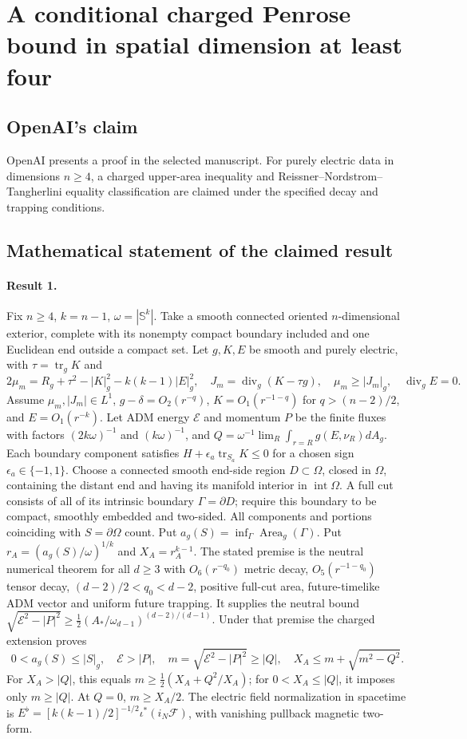 \documentclass[11pt]{article}
\begin{document}
\section*{A conditional charged Penrose bound in spatial dimension at least four}

\subsection{OpenAI's claim}
OpenAI presents a proof in the selected manuscript. For purely electric data in dimensions $n\geq4$, a charged upper-area inequality and Reissner--Nordstrom--Tangherlini equality classification are claimed under the specified decay and trapping conditions.

\subsection{Mathematical statement of the claimed result}
\paragraph{Result 1.} Fix $n\ge4$, $k=n-1$, $\omega=|\mathbb S^k|$. Take a smooth connected oriented $n$-dimensional exterior, complete with its nonempty compact boundary included and one Euclidean end outside a compact set. Let $g,K,E$ be smooth and purely electric, with $\tau=\operatorname{tr}_gK$ and
\[
 2\mu_m=R_g+\tau^2-|K|_g^2-k(k-1)|E|_g^2,\quad
 J_m=\operatorname{div}_g(K-\tau g),\quad
 \mu_m\ge|J_m|_g,\quad\operatorname{div}_gE=0.
\]
Assume $\mu_m,|J_m|\in L^1$, $g-\delta=O_2(r^{-q})$, $K=O_1(r^{-1-q})$ for $q>(n-2)/2$, and $E=O_1(r^{-k})$. Let ADM energy $\mathcal E$ and momentum $P$ be the finite fluxes with factors $(2k\omega)^{-1}$ and $(k\omega)^{-1}$, and $Q=\omega^{-1}\lim_R\int_{r=R}g(E,\nu_R)dA_g$. Each boundary component satisfies $H+\epsilon_a\operatorname{tr}_{S_a}K\le0$ for a chosen sign $\epsilon_a\in\{-1,1\}$. Choose a connected smooth end-side region $D\subset\Omega$, closed in $\Omega$, containing the distant end and having its manifold interior in $\operatorname{int}\Omega$. A full cut consists of all of its intrinsic boundary $\Gamma=\partial D$; require this boundary to be compact, smoothly embedded and two-sided. All components and portions coinciding with $S=\partial\Omega$ count. Put $a_g(S)=\inf_\Gamma\operatorname{Area}_g(\Gamma)$. Put $r_A=(a_g(S)/\omega)^{1/k}$ and $X_A=r_A^{k-1}$. The stated premise is the neutral numerical theorem for all $d\ge3$ with $O_6(r^{-q_0})$ metric decay, $O_5(r^{-1-q_0})$ tensor decay, $(d-2)/2<q_0<d-2$, positive full-cut area, future-timelike ADM vector and uniform future trapping. It supplies the neutral bound $\sqrt{\mathcal E^2-|P|^2}\ge\frac12(A_*/\omega_{d-1})^{(d-2)/(d-1)}$. Under that premise the charged extension proves
\[
 0<a_g(S)\le|S|_g,\quad\mathcal E>|P|,\quad m=\sqrt{\mathcal E^2-|P|^2}\ge|Q|,\quad
 X_A\le m+\sqrt{m^2-Q^2}.
\]
For $X_A>|Q|$, this equals $m\ge\frac12(X_A+Q^2/X_A)$; for $0<X_A\le|Q|$, it imposes only $m\ge|Q|$. At $Q=0$, $m\ge X_A/2$. The electric field normalization in spacetime is $E^\flat=[k(k-1)/2]^{-1/2}\iota^*(i_N\mathcal F)$, with vanishing pullback magnetic two-form.
\end{document}
